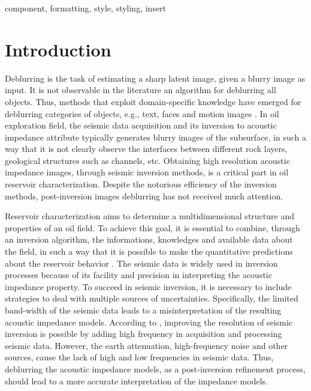 \documentclass[conference]{IEEEtran}
\begin{document}
\begin{IEEEkeywords}
component, formatting, style, styling, insert
\end{IEEEkeywords}

\section{Introduction}
Deblurring is the task of estimating a sharp latent image,
given a blurry image as input.
It is not observable in the literature
an algorithm for deblurring all objects. Thus, methods that exploit
domain-specific knowledge have emerged for deblurring
categories of objects, e.g., text, faces and motion images \cite{Grigorios2017}.
In oil exploration field, the seismic data acquisition and its
inversion to acoustic impedance attribute typically generates
blurry images of the subsurface, in such a way that it is not
clearly observe the interfaces between different rock layers,
geological structures such as channels, etc.
Obtaining high resolution acoustic impedance images, through seismic inversion methods,
is a critical part in oil reservoir characterization.
Despite the notorious efficiency of the inversion methods,
post-inversion images deblurring has not received much attention.

Reservoir characterization aims to determine a multidimensional
structure and properties of an oil field. To achieve this goal, it is essential to combine, through an
inversion algorithm, the informations, knowledges and available data about the field,
in such a way that it is possible to make the
quantitative predictions about the reservoir behavior \cite{buiting}.
The seismic data is widely used in inversion processes because of its facility and precision
in interpreting the acoustic impedance property.
To succeed in seismic inversion, it is necessary to include strategies to deal with multiple
sources of uncertainties. Specifically, the limited band-width of the seismic data leads to
a misinterpretation of the resulting acoustic impedance models.
According to \cite{xiaoiu}, improving the resolution of seismic inversion is
possible by adding high frequency in acquisition and processing seismic data.
However, the earth attenuation, high-frequency noise and other sources, cause
the lack of high and low frequencies in seismic data. 
Thus, deblurring the acoustic impedance models, as a post-inversion refinement process, should lead to a more accurate
interpretation of the impedance models.
\end{document}
